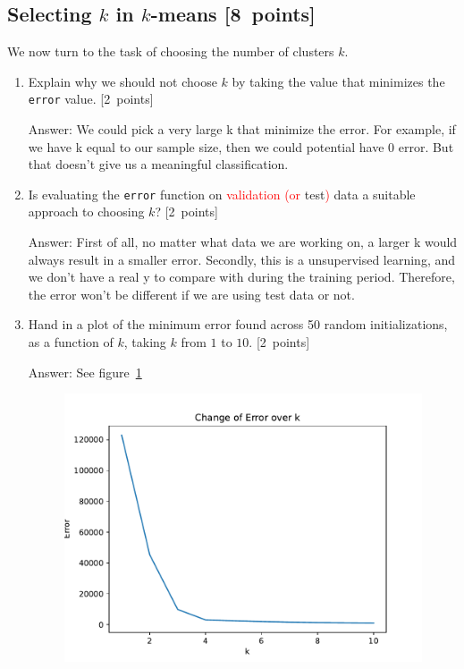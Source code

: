\documentclass{article}
\newcommand{\blu}[1]{{\textcolor{blu}{#1}}}
\newcommand{\red}[1]{\textcolor{red}{#1}}
\newenvironment{answer}{\par\begingroup\color{gre}Answer: }{\endgroup}
\let\ask\blu
\let\update\red
\newcommand\pts[1]{\textcolor{pointscolour}{[#1~points]}}
\begin{document}
    \subsection{Selecting $k$ in $k$-means \pts{8}}

    We now turn to the task of choosing the number of clusters $k$.

    \begin{enumerate}
        \item \ask{Explain why we should not choose $k$ by taking the value that minimizes the \texttt{error} value.} \pts{2}
        \begin{answer}
            We could pick a very large k that minimize the error. For example, if we have k equal to our sample size, then we could potential have 0 error. But that doesn't give us a meaningful classification.
        \end{answer}
        \item \ask{Is evaluating the \texttt{error} function on \update{validation (or} test\update{)} data a suitable approach to choosing $k$?} \pts{2}
        \begin{answer}
            First of all, no matter what data we are working on, a larger k would always result in a smaller error. Secondly, this is a unsupervised learning, and we don't have a real y to compare with during the training period. Therefore, the error won't be different if we are using test data or not.
        \end{answer}
        \item \ask{Hand in a plot of the minimum error found across 50 random initializations, as a function of $k$, taking $k$ from $1$ to $10$.} \pts{2}
        \begin{answer}
            See figure~\ref{fig5.2.3}
        \end{answer}
        \begin{figure}
            \centering\label{fig5.2.3}
            \includegraphics[width = .8\textwidth]{figs/k_selection.pdf}

\end{figure}
\end{enumerate}
\end{document}
